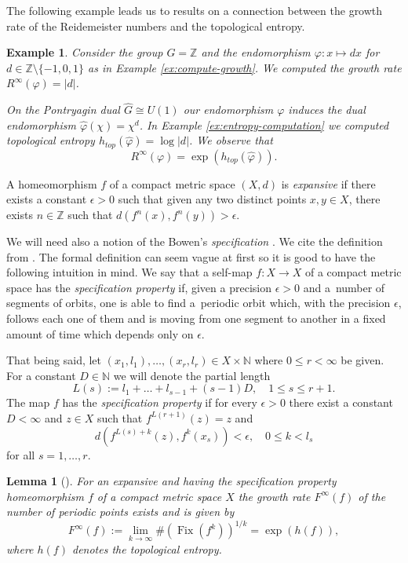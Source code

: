 \documentclass[12pt, a4paper]{amsart}
\def\Z{{\mathbb Z}}
\newtheorem{lemma}[theorem]{Lemma}
\newtheorem{example}[theorem]{Example}
\def\Fix{\operatorname{Fix}}
\begin{document}
The following example leads us to results on a connection between the growth rate
of the Reidemeister numbers and the topological entropy.
\begin{example}\label{ex:connection-growth-entropy}
  Consider the group $G = \mathbb{Z}$ and the endomorphism $\varphi: x \mapsto dx$
  for $d \in \mathbb{Z} \setminus \{-1, 0, 1\}$ as in Example \ref{ex:compute-growth}.
  We computed the growth rate $R^\infty(\varphi) = |d|$.

  On the Pontryagin dual $\hat{G} \cong U(1)$ our endomorphism $\varphi$ induces the dual endomorphism $\hat{\varphi}(\chi) = \chi^d$.
  In Example \ref{ex:entropy-computation} we computed topological entropy
  $h_{top}(\hat{\varphi}) = \log |d|$.
  We observe that
  \begin{equation*}
    R^{\infty}(\varphi) = \exp(h_{top}(\hat{\varphi})).
  \end{equation*}
\end{example}

A homeomorphism $f$ of a compact metric space $(X,d)$ is \emph{expansive} if there exists a constant $\epsilon > 0$
such that given any two distinct points $x, y \in X$, there exists $ n \in \Z$ such that $d(f^n(x), f^n(y)) >\epsilon$.

We will need also a notion of the Bowen's \emph{specification} \cite{Bow}.
We cite the definition from \cite{Buzzi}.
The formal definition can seem vague at first so it is good to have the following intuition in mind.
We say that a self-map $f: X \to X$ of a compact metric space has the \emph{specification property}
if, given a precision $\epsilon>0$ and a~number of segments of orbits, one is able to find a~periodic orbit
which, with the precision $\epsilon$, follows each one of them and is moving from one segment to another
in a fixed amount of time which depends only on $\epsilon$.

That being said, let $(x_1, l_1),\dots,(x_r, l_r) \in X \times \mathbb{N}$ where $0 \leq r < \infty$ be given.
For a constant $D \in \mathbb{N}$ we will denote the partial length
$$
  L(s) := l_1 + \dots + l_{s-1} + (s-1)D, \quad 1 \leq s \leq r+1.
$$
The map $f$ has the \emph{specification property} if for every $\epsilon>0$ there exist a constant $D<\infty$
and $z \in X$ such that $f^{L(r+1)}(z) = z$ and
$$
  d(f^{L(s)+k}(z), f^k(x_s)) < \epsilon, \quad 0 \leq k < l_s
$$
for all $s = 1,\dots,r$.


\begin{lemma}[]\label{B}
 For an expansive and having the specification property homeomorphism $f$ of a compact metric space $X$ the growth rate $F^\infty(f)$ of the number of periodic points exists and is given by
$$ F^\infty(f):=\lim_{k\to\infty} \#(\Fix(f^k))^{1/k} = \exp(h(f)), $$
where $h(f)$ denotes the topological entropy.
\end{lemma}
\end{document}
